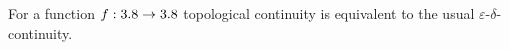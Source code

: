 \begin{definition}
\end{definition}

\begin{proposition}\label{prop:topological-continuity-epsilon-delta-equivalence}
For a function $f : 3.8 \to 3.8$ topological continuity is equivalent to the usual $\varepsilon$-$\delta$-continuity.
\end{proposition}
